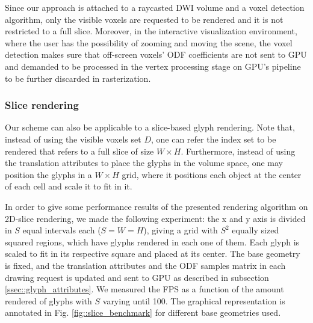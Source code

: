 \documentclass[twoside,twocolumn,10pt]{article}
\begin{document}


Since our approach is attached to a raycasted DWI volume and a voxel detection algorithm, only the visible voxels are requested to be rendered and it is not restricted to a full slice. Moreover, in the interactive visualization environment, where the user has the possibility of zooming and moving the scene, the voxel detection makes sure that off-screen voxels' ODF coefficients are not sent to GPU and demanded to be processed in the vertex processing stage on GPU's pipeline to be further discarded in rasterization.

\subsubsection{Slice rendering}

Our scheme can also be applicable to a slice-based glyph rendering. Note that, instead of using the visible voxels set $D$, one can refer the index set to be rendered that refers to a full slice of size $W \times H$. Furthermore, instead of using the translation attributes to place the glyphs in the volume space, one may position the glyphs in a $W \times H$ grid, where it positions each object at the center of each cell and scale it to fit in it.

In order to give some performance results of the presented rendering algorithm on 2D-slice rendering, we made the following experiment: the x and y axis is divided in $S$ equal intervals each ($S = W = H$), giving a grid with $S^2$ equally sized squared regions, which have glyphs rendered in each one of them. Each glyph is scaled to fit in its respective square and placed at its center. The base geometry is fixed, and the translation attributes and the ODF samples matrix in each drawing request is updated and sent to GPU as described in subsection \ref{ssec::glyph_attributes}. We measured the FPS as a function of the amount rendered of glyphs with $S$ varying until 100. The graphical representation is annotated in Fig. \ref{fig::slice_benchmark} for different base geometries used.
\end{document}
